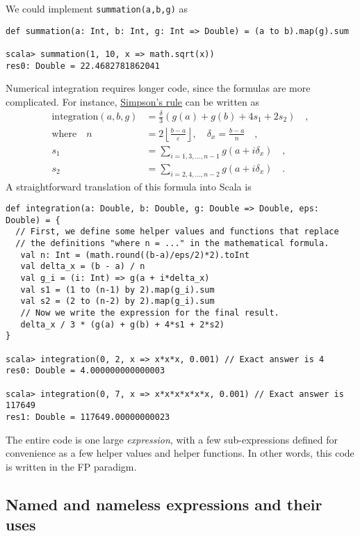 We could implement \texttt{}\lstinline!summation(a,b,g)!
as
\begin{lstlisting}
def summation(a: Int, b: Int, g: Int => Double) = (a to b).map(g).sum

scala> summation(1, 10, x => math.sqrt(x))
res0: Double = 22.4682781862041
\end{lstlisting}
Numerical integration requires longer code, since the formulas are
more complicated. For instance, \href{https://en.wikipedia.org/wiki/Simpson\%27s_rule}{Simpson's rule}
can be written as
\begin{align*}
\text{integration}\left(a,b,g\right) & =\frac{\delta}{3}\left(g(a)+g(b)+4s_{1}+2s_{2}\right)\quad,\\
\text{where }~~~n & =2\left\lfloor \frac{b-a}{\varepsilon}\right\rfloor ,\quad\delta_{x}=\frac{b-a}{n}\quad,\\
s_{1} & =\sum_{i=1,3,...,n-1}g(a+i\delta_{x})\quad,\\
s_{2} & =\sum_{i=2,4,...,n-2}g(a+i\delta_{x})\quad.
\end{align*}
 A straightforward translation of this formula into Scala is
\begin{lstlisting}
def integration(a: Double, b: Double, g: Double => Double, eps: Double) = {
  // First, we define some helper values and functions that replace
  // the definitions "where n = ..." in the mathematical formula.
   val n: Int = (math.round((b-a)/eps/2)*2).toInt
   val delta_x = (b - a) / n
   val g_i = (i: Int) => g(a + i*delta_x)
   val s1 = (1 to (n-1) by 2).map(g_i).sum
   val s2 = (2 to (n-2) by 2).map(g_i).sum
   // Now we write the expression for the final result.
   delta_x / 3 * (g(a) + g(b) + 4*s1 + 2*s2)
}

scala> integration(0, 2, x => x*x*x, 0.001) // Exact answer is 4
res0: Double = 4.000000000000003

scala> integration(0, 7, x => x*x*x*x*x*x, 0.001) // Exact answer is 117649
res1: Double = 117649.00000000023 
\end{lstlisting}
The entire code is one large \emph{expression}, with a few sub-expressions
defined for convenience as a few helper values and helper functions.
In other words, this code is written in the FP paradigm.

\subsection{Named and nameless expressions and their uses}

